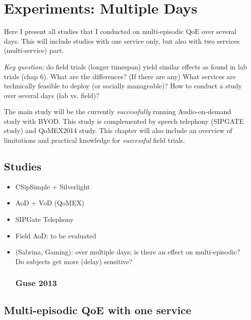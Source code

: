 \chapter{Experiments: Multiple Days}\label{chap:field}
\begin{chapter-abstract}
Here I present all studies that I conducted on multi-episodic QoE over several days.
This will include studies with one service only, but also with two services (multi-service) part.

\textit{Key question:} do field trials (longer timespan) yield similar effects as found in lab trials (chap 6).
What are the differences? (If there are any)
What services are technically feasible to deploy (or socially manageable)?
How to conduct a study over several days (lab vs. field)?

The main study will be the currently \textit{successfully} running Audio-on-demand study with BYOD.
This study is complemented by speech telephony (SIPGATE study) and QoMEX2014 study.
This chapter will also include an overview of limitations and practical knowledge for \textit{successful} field trials.
\end{chapter-abstract}

\section{Studies}
\begin{itemize}
\item CSipSimple + Silverlight
\item AoD + VoD (QoMEX)
\item SIPGate Telephony
\item Field AoD: to be evaluated
\item (Sabrina, Gaming): over multiple days; is there an effect on multi-episodic? Do subjects get more (delay) sensitive?
\cite{guse_macro-temporal_2013} %
\subsection{Guse 2013}
\end{itemize}

\section{Multi-episodic QoE with one service}

